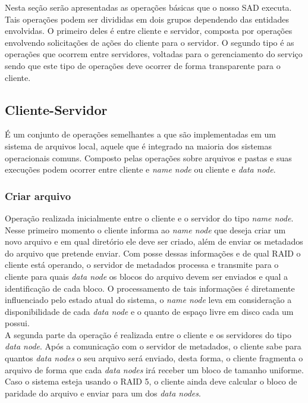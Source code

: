 	Nesta seção serão apresentadas as operações básicas que o nosso SAD executa. Tais operações podem ser divididas em dois grupos dependendo das entidades envolvidas. O primeiro deles é entre cliente e servidor, composta por operações envolvendo solicitações de ações do cliente para o servidor. O segundo tipo é as operações que ocorrem entre servidores, voltadas para o gerenciamento do serviço sendo que este tipo de operações deve ocorrer de forma transparente para o cliente.
	\\
	
	\subsection{Cliente-Servidor}
	
	É um conjunto de operações semelhantes a que são implementadas em um sistema de arquivos local, aquele que é integrado na maioria dos sistemas operacionais comuns. Composto pelas operações sobre arquivos e pastas e suas execuções podem ocorrer entre cliente e \textit{name node} ou cliente e \textit{data node}.
	
	\subsubsection{Criar arquivo}
	
	Operação realizada inicialmente entre o cliente e o servidor do tipo \textit{name node}. Nesse primeiro momento o cliente informa ao \textit{name node} que deseja criar um novo arquivo e em qual diretório ele deve ser criado, além de enviar os metadados do arquivo que pretende enviar. Com posse dessas informações e de qual RAID o cliente está operando, o servidor de metadados processa e transmite para o cliente para quais \textit{data node} os blocos do arquivo devem ser enviados e qual a identificação de cada bloco. O processamento de tais informações é diretamente influenciado pelo estado atual do sistema, o \textit{name node} leva em consideração a disponibilidade de cada \textit{data node} e o quanto de espaço livre em disco cada um possui.
	\\
	
	A segunda parte da operação é realizada entre o cliente e os servidores do tipo \textit{data node}. Após a comunicação com o servidor de metadados, o cliente sabe para quantos \textit{data nodes} o seu arquivo será enviado, desta forma, o cliente fragmenta o arquivo de forma que cada \textit{data nodes} irá receber um bloco de tamanho uniforme. Caso o sistema esteja usando o RAID 5, o cliente ainda deve calcular o bloco de paridade do arquivo e enviar para um dos \textit{data nodes}.
	\\
	
